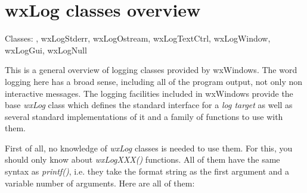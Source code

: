 \section{wxLog classes overview}\label{wxlogoverview}

Classes: , wxLogStderr,
wxLogOstream, wxLogTextCtrl, wxLogWindow, wxLogGui, wxLogNull

This is a general overview of logging classes provided by wxWindows. The word
logging here has a broad sense, including all of the program output, not only
non interactive messages. The logging facilities included in wxWindows provide
the base {\it wxLog} class which defines the standard interface for a {\it log
target} as well as several standard implementations of it and a family of
functions to use with them.

First of all, no knowledge of {\it wxLog} classes is needed to use them. For
this, you should only know about {\it wxLogXXX()} functions. All of them have
the same syntax as {\it printf()}, i.e. they take the format string as the
first argument and a variable number of arguments. Here are all of them:

